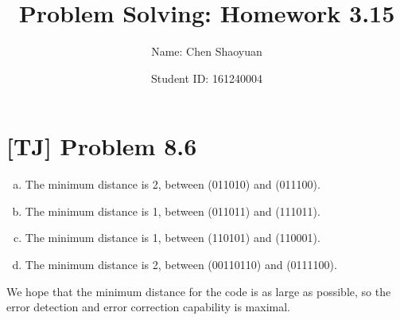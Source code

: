 \documentclass[a4paper,11pt,twocolumn]{article}
\newcommand{\homeworkno}{3.15}
\begin{document}
  \title{Problem Solving: Homework \homeworkno}
  \author{Name: Chen Shaoyuan \and Student ID: 161240004}
  \maketitle

  \section{[TJ] Problem 8.6}
  \begin{enumerate}[(a)]
    \item The minimum distance is 2, between (011010) and (011100).
    \item The minimum distance is 1, between (011011) and (111011).
    \item The minimum distance is 1, between (110101) and (110001).
    \item The minimum distance is 2, between (00110110) and (0111100).
  \end{enumerate}
  We hope that the minimum distance for the code is as large as possible, so the error detection and error correction capability is maximal.
\end{document}
